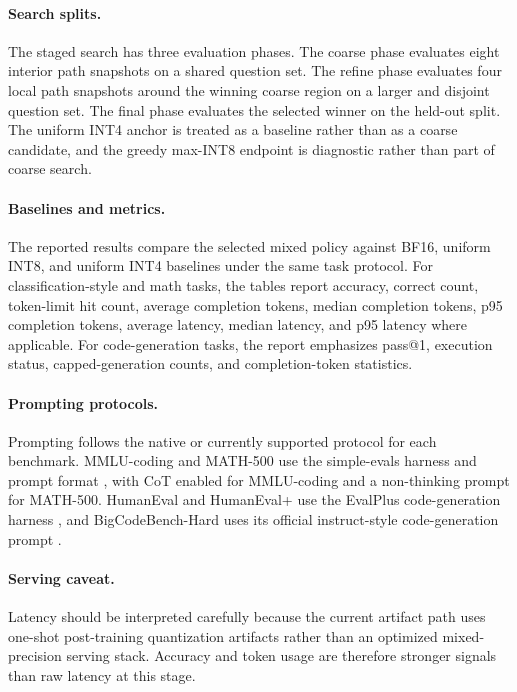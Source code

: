 \documentclass{article}
\newcommand{\intfour}{INT4}
\newcommand{\inteight}{INT8}
\begin{document}
\paragraph{Search splits.}
The staged search has three evaluation phases. The coarse phase evaluates eight interior path snapshots on a shared question set. The refine phase evaluates four local path snapshots around the winning coarse region on a larger and disjoint question set. The final phase evaluates the selected winner on the held-out split. The uniform \intfour{} anchor is treated as a baseline rather than as a coarse candidate, and the greedy max-\inteight{} endpoint is diagnostic rather than part of coarse search.

\paragraph{Baselines and metrics.}
The reported results compare the selected mixed policy against BF16, uniform \inteight{}, and uniform \intfour{} baselines under the same task protocol. For classification-style and math tasks, the tables report accuracy, correct count, token-limit hit count, average completion tokens, median completion tokens, p95 completion tokens, average latency, median latency, and p95 latency where applicable. For code-generation tasks, the report emphasizes pass@1, execution status, capped-generation counts, and completion-token statistics.

\paragraph{Prompting protocols.}
Prompting follows the native or currently supported protocol for each benchmark. MMLU-coding and MATH-500 use the simple-evals harness and prompt format \cite{openai_simple_evals}, with CoT enabled for MMLU-coding and a non-thinking prompt for MATH-500. HumanEval and HumanEval+ use the EvalPlus code-generation harness \cite{liu2023evalplus}, and BigCodeBench-Hard uses its official instruct-style code-generation prompt \cite{zhuo2025bigcodebench}.

\paragraph{Serving caveat.}
Latency should be interpreted carefully because the current artifact path uses one-shot post-training quantization artifacts rather than an optimized mixed-precision serving stack. Accuracy and token usage are therefore stronger signals than raw latency at this stage.
\end{document}
